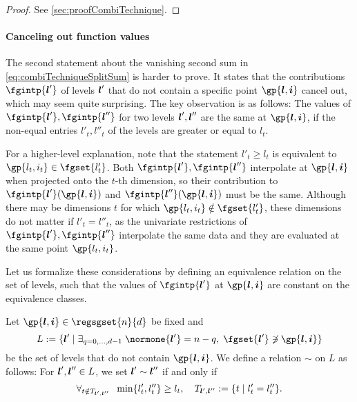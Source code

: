 \begin{proof}
  See \cref{sec:proofCombiTechnique}.
\end{proof}

\paragraph{Canceling out function values}

The second statement about the vanishing second sum in
\eqref{eq:combiTechniqueSplitSum} is harder to prove.
It states that the contributions $\fgintp{\*l'}$ of levels ${\boldsymbol{l}}'$
that do not contain a specific point $\gp{\*l,\*i}$ cancel out,
which may seem quite surprising.
The key observation is as follows:
The values of $\fgintp{\*l'}, \fgintp{\*l''}$ for two levels
${\boldsymbol{l}}', {\boldsymbol{l}}''$ are the same at $\gp{\*l,\*i}$,
if the non-equal entries $l'_t, l''_t$ of the levels are
greater or equal to $l_t$.

For a higher-level explanation,
note that the statement $l'_t \ge l_t$ is equivalent to
$\gp{l_t,i_t} \in \fgset{l'_t}$.
Both $\fgintp{\*l'}, \fgintp{\*l''}$ interpolate at
$\gp{\*l,\*i}$ when projected onto the $t$-th dimension,
so their contribution to $\fgintp{\*l'}(\gp{\*l,\*i})$ and
$\fgintp{\*l''}(\gp{\*l,\*i})$ must be the same.
Although there may be dimensions $t$ for which
$\gp{l_t,i_t} \notin \fgset{l'_t}$,
these dimensions do not matter if $l'_t = l''_t$,
as the univariate restrictions of $\fgintp{\*l'}, \fgintp{\*l''}$
interpolate the same data and they are evaluated at the same point
$\gp{l_t,i_t}$.

Let us formalize these considerations by defining an
equivalence relation on the set of levels, such that the values of
$\fgintp{\*l'}$ at $\gp{\*l,\*i}$ are constant
on the equivalence classes.

\begin{definition}
  \label{def:combiTechniqueEquivalenceRelation}
  Let $\gp{\*l,\*i} \in \regsgset{n}{d}$ be fixed and
  \begin{equation}
    \label{eq:combiTechniqueSpecialLevelSet}
    L
    := \{\*l' \mid \ex{q=0,\dotsc,d-1}{
      \normone{\*l'} = n - q,\; \fgset{\*l'} \notni \gp{\*l,\*i}
    }\}
  \end{equation}
  be the set of levels that do not contain $\gp{\*l,\*i}$.
  We define a relation $\sim$ on $L$ as follows:
  For ${\boldsymbol{l}}', {\boldsymbol{l}}'' \in L$, we set ${\boldsymbol{l}}' \sim {\boldsymbol{l}}''$ if and only if
  \begin{equation}
    \forall_{t \notin T_{{\boldsymbol{l}}',{\boldsymbol{l}}''}}\;\;\min\{l'_t, l''_t\} \ge l_t,\quad
    T_{{\boldsymbol{l}}',{\boldsymbol{l}}''}
    := \{t \mid l'_t = l''_t\}.
  \end{equation}
\end{definition}

